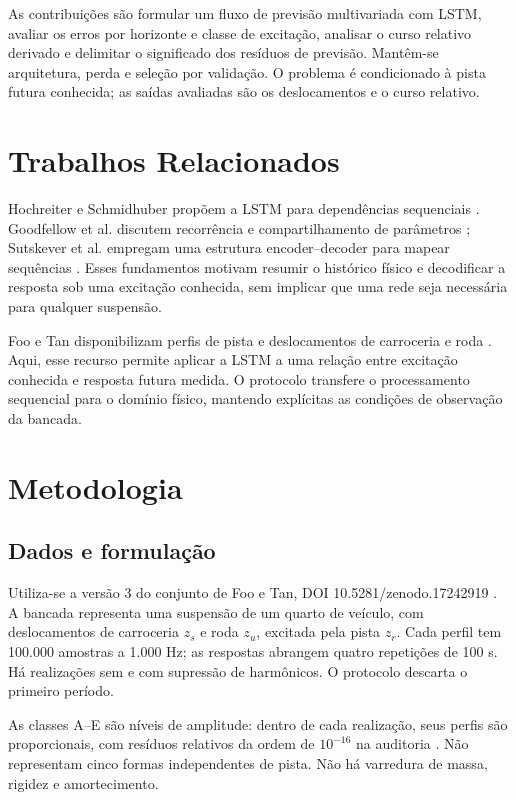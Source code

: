 \documentclass[conference]{IEEEtran}
\begin{document}
As contribuições são formular um fluxo de previsão multivariada com LSTM, avaliar os erros por horizonte e classe de excitação, analisar o curso relativo derivado e delimitar o significado dos resíduos de previsão. Mantêm-se arquitetura, perda e seleção por validação. O problema é condicionado à pista futura conhecida; as saídas avaliadas são os deslocamentos e o curso relativo.

\section{Trabalhos Relacionados}
Hochreiter e Schmidhuber propõem a LSTM para dependências sequenciais \cite{lstm}. Goodfellow et al. discutem recorrência e compartilhamento de parâmetros \cite{goodfellow}; Sutskever et al. empregam uma estrutura encoder--decoder para mapear sequências \cite{seq2seq}. Esses fundamentos motivam resumir o histórico físico e decodificar a resposta sob uma excitação conhecida, sem implicar que uma rede seja necessária para qualquer suspensão.

Foo e Tan disponibilizam perfis de pista e deslocamentos de carroceria e roda \cite{dataset}. Aqui, esse recurso permite aplicar a LSTM a uma relação entre excitação conhecida e resposta futura medida. O protocolo transfere o processamento sequencial para o domínio físico, mantendo explícitas as condições de observação da bancada.

\section{Metodologia}
\subsection{Dados e formulação}
Utiliza-se a versão 3 do conjunto de Foo e Tan, DOI 10.5281/zenodo.17242919 \cite{dataset}. A bancada representa uma suspensão de um quarto de veículo, com deslocamentos de carroceria $z_s$ e roda $z_u$, excitada pela pista $z_r$. Cada perfil tem 100.000 amostras a 1.000 Hz; as respostas abrangem quatro repetições de 100 s. Há realizações sem e com supressão de harmônicos. O protocolo descarta o primeiro período.

As classes A--E são níveis de amplitude: dentro de cada realização, seus perfis são proporcionais, com resíduos relativos da ordem de $10^{-16}$ na auditoria \cite{repo}. Não representam cinco formas independentes de pista. Não há varredura de massa, rigidez e amortecimento.
\end{document}
